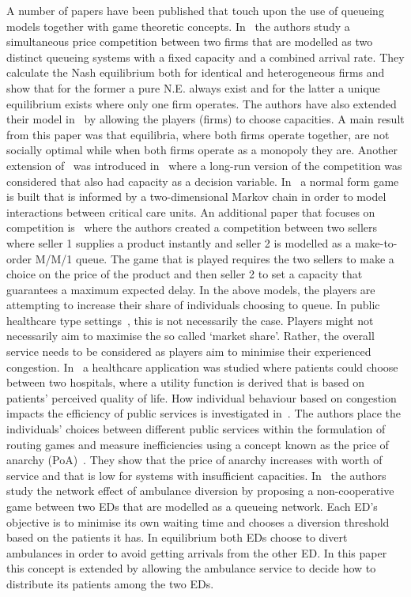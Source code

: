 A number of papers have been published that touch upon the use of 
queueing models together with game theoretic concepts.
In~\cite{FirmCompetition} the authors study a simultaneous price competition 
between two firms that are modelled as two distinct queueing systems with a 
fixed capacity and a combined arrival rate.
They calculate the Nash equilibrium both for identical and heterogeneous firms
and show that for the former a pure N.E. always exist and for the latter a 
unique equilibrium exists where only one firm operates.
The authors have also extended their model in~\cite{FirmCompetition2} by 
allowing the players (firms) to choose capacities. 
A main result from this paper was that equilibria, where both firms operate
together, are not socially optimal while when both firms operate as a monopoly 
they are.
Another extension of~\cite{FirmCompetition} was introduced 
in~\cite{FirmCompetitionExtension} where a long-run version of the competition 
was considered that also had capacity as a decision variable.
In~\cite{knight2017measuring} a normal form game is built that is informed by a 
two-dimensional Markov chain in order to model interactions between critical
care units.
An additional paper that focuses on competition is~\cite{fan2009short} where
the authors created a competition between two sellers where seller 1 supplies 
a product instantly and seller 2 is modelled as a make-to-order M/M/1 queue.
The game that is played requires the two sellers to make a choice on the price 
of the product and then seller 2 to set a capacity that guarantees a maximum 
expected delay.
In the above models, the players are attempting to increase their share of 
individuals choosing to queue.
In public healthcare type settings~\cite{knight2013selfish}, this is not 
necessarily the case. 
Players might not necessarily aim to maximise the so called `market share'.
Rather, the overall service needs to be considered as players aim to minimise
their experienced congestion.
In~\cite{sadat2015can} a healthcare application was studied where patients 
could choose between two hospitals, where a utility function is derived that is
based on patients' perceived quality of life.
How individual behaviour based on congestion impacts the efficiency of public 
services is investigated in~\cite{knight2013selfish}.
The authors place the individuals' choices between different public services 
within the formulation of routing games and measure inefficiencies using a 
concept known as the price of anarchy (PoA)~\cite{koutsoupias1999worst}.
They show that the price of anarchy increases with worth of service and that is
low for systems with insufficient capacities.
In~\cite{deo2011centralized} the authors study the network effect of ambulance 
diversion by proposing a non-cooperative game between two EDs that are modelled
as a queueing network.
Each ED's objective is to minimise its own waiting time and chooses a diversion
threshold based on the patients it has.
In equilibrium both EDs choose to divert ambulances in order to avoid getting
arrivals from the other ED.
In this paper this concept is extended by allowing the ambulance service to 
decide how to distribute its patients among the two EDs.

